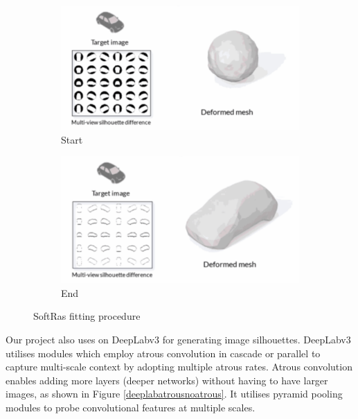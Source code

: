 \documentclass{article}
\begin{document}
\begin{figure}[h!]
  \centering
  \begin{subfigure}{0.45\textwidth}
    \centering
    \includegraphics[width=\textwidth]{images/softrasinit.png}
    \caption{Start}
    \label{softrasstart}
  \end{subfigure}
  \hfill
  \begin{subfigure}{0.45\textwidth}
    \centering
    \includegraphics[width=\textwidth]{images/softrasresults.png}
    \caption{End}
    \label{softrasend}
  \end{subfigure}
  \caption{SoftRas fitting procedure}
  \label{softrasresults}
\end{figure}

Our project also uses on DeepLabv3 \parencite{deeplab} for generating image silhouettes. DeepLabv3 utilises modules which employ atrous convolution in cascade or parallel to capture multi-scale context by adopting multiple atrous rates. Atrous convolution enables adding more layers (deeper networks) without having to have larger images, as shown in Figure \ref{deeplabatrousnoatrous}. It utilises pyramid pooling modules to probe convolutional features at multiple scales.
\end{document}
